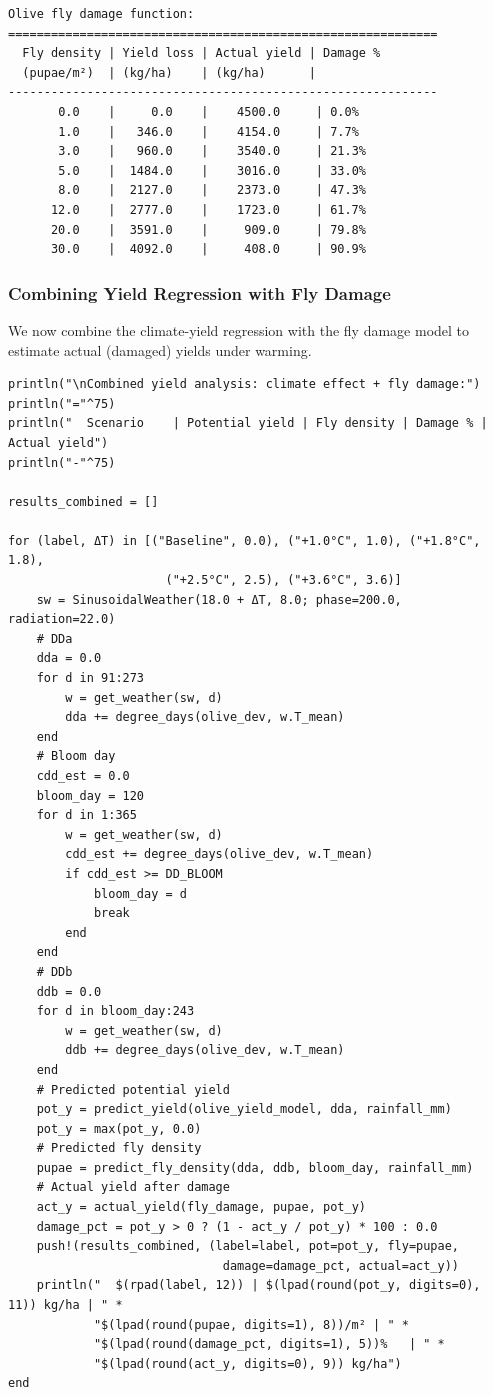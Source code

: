 \begin{verbatim}
Olive fly damage function:
============================================================
  Fly density | Yield loss | Actual yield | Damage %
  (pupae/m²)  | (kg/ha)    | (kg/ha)      |
------------------------------------------------------------
       0.0    |     0.0    |    4500.0     | 0.0%
       1.0    |   346.0    |    4154.0     | 7.7%
       3.0    |   960.0    |    3540.0     | 21.3%
       5.0    |  1484.0    |    3016.0     | 33.0%
       8.0    |  2127.0    |    2373.0     | 47.3%
      12.0    |  2777.0    |    1723.0     | 61.7%
      20.0    |  3591.0    |     909.0     | 79.8%
      30.0    |  4092.0    |     408.0     | 90.9%
\end{verbatim}



\subsubsection{Combining Yield Regression with Fly Damage}



\label{10626385129207322611}{}


We now combine the climate-yield regression with the fly damage model to estimate actual (damaged) yields under warming.




\begin{verbatim}
println("\nCombined yield analysis: climate effect + fly damage:")
println("="^75)
println("  Scenario    | Potential yield | Fly density | Damage % | Actual yield")
println("-"^75)

results_combined = []

for (label, ΔT) in [("Baseline", 0.0), ("+1.0°C", 1.0), ("+1.8°C", 1.8),
                      ("+2.5°C", 2.5), ("+3.6°C", 3.6)]
    sw = SinusoidalWeather(18.0 + ΔT, 8.0; phase=200.0, radiation=22.0)
    # DDa
    dda = 0.0
    for d in 91:273
        w = get_weather(sw, d)
        dda += degree_days(olive_dev, w.T_mean)
    end
    # Bloom day
    cdd_est = 0.0
    bloom_day = 120
    for d in 1:365
        w = get_weather(sw, d)
        cdd_est += degree_days(olive_dev, w.T_mean)
        if cdd_est >= DD_BLOOM
            bloom_day = d
            break
        end
    end
    # DDb
    ddb = 0.0
    for d in bloom_day:243
        w = get_weather(sw, d)
        ddb += degree_days(olive_dev, w.T_mean)
    end
    # Predicted potential yield
    pot_y = predict_yield(olive_yield_model, dda, rainfall_mm)
    pot_y = max(pot_y, 0.0)
    # Predicted fly density
    pupae = predict_fly_density(dda, ddb, bloom_day, rainfall_mm)
    # Actual yield after damage
    act_y = actual_yield(fly_damage, pupae, pot_y)
    damage_pct = pot_y > 0 ? (1 - act_y / pot_y) * 100 : 0.0
    push!(results_combined, (label=label, pot=pot_y, fly=pupae,
                              damage=damage_pct, actual=act_y))
    println("  $(rpad(label, 12)) | $(lpad(round(pot_y, digits=0), 11)) kg/ha | " *
            "$(lpad(round(pupae, digits=1), 8))/m² | " *
            "$(lpad(round(damage_pct, digits=1), 5))%   | " *
            "$(lpad(round(act_y, digits=0), 9)) kg/ha")
end
\end{verbatim}




